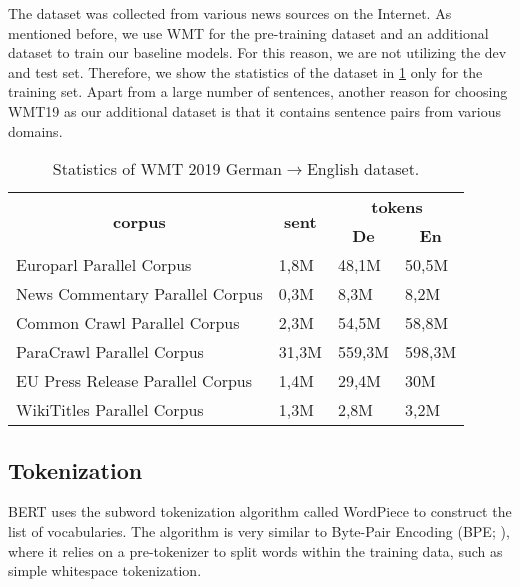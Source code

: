 The dataset was collected from various news sources on the Internet. As mentioned before, we use WMT for the pre-training dataset and an additional dataset to train our baseline models. For this reason, we are not utilizing the dev and test set. Therefore, we show the statistics of the dataset in \cref{tab:wmt19stat} only for the training set. Apart from a large number of sentences, another reason for choosing WMT19 as our additional dataset is that it contains sentence pairs from various domains.

\begin{table}[h]
    \centering
    \begin{tabular}{@{}llll@{}}
        \toprule
        \multicolumn{1}{c}{\multirow{2}{*}{\textbf{corpus}}} &
        \multicolumn{1}{c}{\multirow{2}{*}{\textbf{sent}}}   &
        \multicolumn{2}{c}{\textbf{tokens}}                                            \\
        \multicolumn{1}{c}{}                                 &
        \multicolumn{1}{c}{}                                 &
        \multicolumn{1}{c}{\textbf{De}}                      &
        \multicolumn{1}{c}{\textbf{En}}                                                \\ \midrule
        Europarl Parallel Corpus                             & 1,8M  & 48,1M  & 50,5M  \\
        News Commentary Parallel Corpus                      & 0,3M  & 8,3M   & 8,2M   \\
        Common Crawl Parallel Corpus                         & 2,3M  & 54,5M  & 58,8M  \\
        ParaCrawl Parallel Corpus                            & 31,3M & 559,3M & 598,3M \\
        EU Press Release Parallel Corpus                     & 1,4M  & 29,4M  & 30M    \\
        WikiTitles Parallel Corpus                           & 1,3M  & 2,8M   & 3,2M   \\ \bottomrule
    \end{tabular}
    \caption{Statistics of WMT 2019 German$\rightarrow$English dataset.}
    \label{tab:wmt19stat}
\end{table}

\subsection{Tokenization}
BERT uses the subword tokenization algorithm called WordPiece  to construct the list of vocabularies. The algorithm is very similar to Byte-Pair Encoding (BPE; \cite{sennrich-etal-2016-neural}), where it relies on a pre-tokenizer to split words within the training data, such as simple whitespace tokenization.

